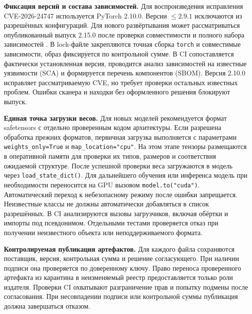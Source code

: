 \documentclass[12pt,a4paper]{report}
\begin{document}
\textbf{Фиксация версий и состава зависимостей.} Для воспроизведения исправления CVE-2026-24747 используется PyTorch 2.10.0. Версии $\leq 2.9.1$ исключаются из разрешённых конфигураций. Для нового развёртывания может рассматриваться опубликованный выпуск 2.15.0 после проверки совместимости и полного набора зависимостей \cite{ghsa,torchrelease215}. В lock-файле закрепляются точная сборка \texttt{torch} и совместимые зависимости, образ фиксируется по контрольной сумме. В CI сопоставляется фактически установленная версия, проводится анализ зависимостей на известные уязвимости (SCA) и формируется перечень компонентов (SBOM). Версия 2.10.0 исправляет рассматриваемую CVE, но требует проверки остальных известных проблем. Ошибки сканера и находки без оформленного решения блокируют выпуск.

\textbf{Единая точка загрузки весов.} Для новых моделей рекомендуется формат safetensors с отдельно проверенным кодом архитектуры. Если разрешена обработка прежних форматов, первичная загрузка выполняется с параметрами \texttt{weights\_only=True} и \texttt{map\_location="cpu"}. На этом этапе тензоры размещаются в оперативной памяти для проверки их типов, размеров и соответствия ожидаемой структуре. После успешной проверки веса загружаются в модель через \texttt{load\_state\_dict()}. Для дальнейшего обучения или инференса модель при необходимости переносится на GPU вызовом \texttt{model.to("cuda")}. Автоматический переход к небезопасному режиму после ошибки запрещается. Неизвестные классы не должны автоматически добавляться в список разрешённых. В CI анализируются вызовы загрузчиков, включая обёртки и импорты под псевдонимом. Отдельными тестами проверяется отказ при получении неизвестного объекта или неподдерживаемого формата.

\textbf{Контролируемая публикация артефактов.} Для каждого файла сохраняются поставщик, версия, контрольная сумма и решение согласующего. При наличии подписи она проверяется по доверенному ключу. Право переноса проверенного артефакта из карантина в неизменяемый реестр предоставляется только роли издателя. Проверки CI охватывают разграничение прав и попытку подмены после согласования. При несовпадении подписи или контрольной суммы публикация должна завершаться отказом.
\end{document}

